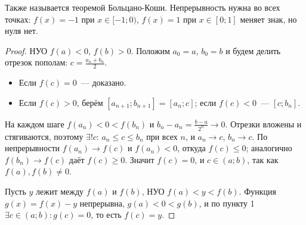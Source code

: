 

\begin{remark}
  Также называется теоремой Больцано-Коши. Непрерывность нужна во всех точках: $f(x) = -1$ при $x \in [-1;0)$, $f(x) = 1$ при $x \in [0;1]$ меняет знак, но нуля нет.
\end{remark}

\begin{proof}
  НУО $f(a) < 0$, $f(b) > 0$. Положим $a_0 = a$, $b_0 = b$ и будем делить отрезок пополам: $c = \frac{a_n + b_n}{2}$.

  \begin{itemize}
    \item Если $f(c) = 0$~--- доказано.
    \item Если $f(c) > 0$, берём $[a_{n+1}; b_{n+1}] = [a_n; c]$; если $f(c) < 0$~--- $[c; b_n]$.
  \end{itemize}

  На каждом шаге $f(a_n) < 0 < f(b_n)$ и $b_n - a_n = \frac{b - a}{2^n} \to 0$. Отрезки вложены и стягиваются, поэтому $\exists! c$: $a_n \le c \le b_n$ при всех $n$, и $a_n \to c$, $b_n \to c$.
  По непрерывности $f(a_n) \to f(c)$ и $f(a_n) < 0$, откуда $f(c) \le 0$; аналогично $f(b_n) \to f(c)$ даёт $f(c) \ge 0$. Значит $f(c) = 0$, и $c \in (a;b)$, так как $f(a), f(b) \ne 0$.

  Пусть $y$ лежит между $f(a)$ и $f(b)$, НУО $f(a) < y < f(b)$. Функция $g(x) = f(x) - y$ непрерывна, $g(a) < 0 < g(b)$, и по пункту 1 $\exists c \in (a;b): g(c) = 0$, то есть $f(c) = y$.
\end{proof}
